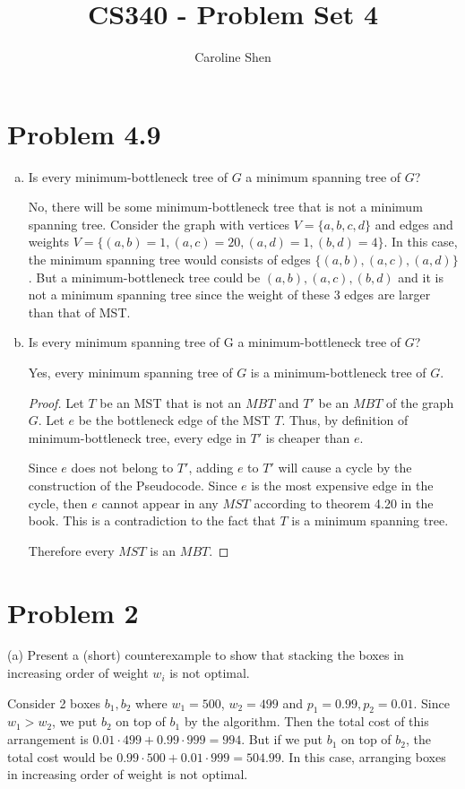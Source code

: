 \documentclass[11pt, oneside]{article}   	%
\title{CS340 - Problem Set 4}
\author{Caroline Shen}
\date{}							%
\begin{document}
\maketitle
\section{Problem 4.9}
\begin{enumerate}[(a)]
    \item Is every minimum-bottleneck tree of $G$ a minimum spanning tree of $G$?
    
    No, there will be some minimum-bottleneck tree that is not a minimum spanning tree. Consider the graph with vertices $V = \{a,b,c,d\}$ and edges and weights $V=\{(a,b) = 1, (a,c) = 20, (a,d) = 1, (b,d)=4\}$. In this case, the minimum spanning tree would consists of edges $\{(a,b),(a,c),(a,d)\}$. But a minimum-bottleneck tree could be $(a,b),(a,c),(b,d)$ and it is not a minimum spanning tree since the weight of these 3 edges are larger than that of MST.
    
    \item Is every minimum spanning tree of G a minimum-bottleneck tree of $G$?
    
    Yes, every minimum spanning tree of $G$ is a minimum-bottleneck tree of $G$.
    \begin{proof}
    Let $T$ be an MST that is not an $MBT$ and $T'$ be an $MBT$ of the graph $G$. Let $e$ be the bottleneck edge of the MST $T$. Thus, by definition of minimum-bottleneck tree, every edge in $T'$ is cheaper than $e$. 
    
    Since $e$ does not belong to $T'$, adding $e$ to $T'$ will cause a cycle by the construction of the Pseudocode. Since $e$ is the most expensive edge in the cycle, then $e$ cannot appear in any $MST$ according to theorem 4.20 in the book. This is a contradiction to the fact that $T$ is a minimum spanning tree.
    
    Therefore every $MST$ is an $MBT$.
    \end{proof}
\end{enumerate}

\section{Problem 2}
(a) Present a (short) counterexample to show that stacking the boxes in increasing order of weight $w_i$ is not optimal.

Consider 2 boxes $b_1, b_2$ where $w_1 = 500$, $w_2 = 499$ and $p_1 = 0.99, p_2 = 0.01$. Since $w_1>w_2$, we put $b_2$ on top of $b_1$ by the algorithm. Then the total cost of this arrangement is $0.01\cdot 499 + 0.99 \cdot 999 = 994$. But if we put $b_1$ on top of $b_2$, the total cost would be $0.99 \cdot 500 + 0.01 \cdot 999 = 504.99$. In this case, arranging boxes in increasing order of weight is not optimal.
\end{document}
